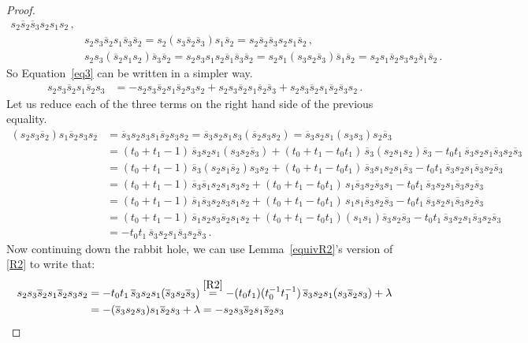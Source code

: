 \documentclass[12pt,reqno]{amsart}
\theoremstyle{definition}
\def\hs{\overline{s}}
\begin{document}
\begin{proof}
\begin{align*}
s_2 \hs_2 \hs_3 s_2 s_1 s_2 \,,
\\
&s_2 s_3 \hs_2 s_1 \hs_3 \hs_2    = s_2 (s_3 \hs_2 \hs_3) s_1 \hs_2
= s_2 \hs_2 \hs_3 s_2 s_1 \hs_2 \,,
\\
&s_2 s_3 (\hs_2 s_1 s_2) \hs_3 \hs_2   = s_2 s_3 s_1 s_2 \hs_1 \hs_3 \hs_2
= s_2 s_1 (s_3 s_2 \hs_3) \hs_1 \hs_2 = s_2 s_1 \hs_2 s_3 s_2 \hs_1 \hs_2 \,.
\end{align*}
So Equation~\eqref{eq3} can be written in a simpler way.
\begin{align*}
  s_2 s_3 \hs_2 s_1 \hs_2 s_3&   =  - s_2 s_3 \hs_2 s_1 \hs_2 s_3 s_2
  + s_2 s_3 \hs_2 s_1 \hs_2 \hs_3 + s_2 s_3 \hs_2 s_1 \hs_2 \hs_3 s_2 \,.
\end{align*}
Let us reduce each of the three terms on the right hand side of the previous equality.
\begin{align*}
  (s_2 s_3 \hs_2) s_1 \hs_2 s_3 s_2   & = \hs_3 s_2 s_3 s_1 \hs_2 s_3 s_2
  = \hs_3 s_2 s_1 s_3 (\hs_2 s_3 s_2) = \hs_3 s_2 s_1 (s_3 s_3) s_2 \hs_3 \\
  & =  (t_0 + t_1 - 1) \, \hs_3 s_2 s_1 (s_3 s_2 \hs_3) + (t_0 + t_1 - t_0 t_1 )\,
  \hs_3 (s_2 s_1 s_2) \hs_3 - t_0 t_1 \, \hs_3 s_2 s_1 \hs_3 s_2 \hs_3 \\
  & =  (t_0 + t_1 - 1) \, \hs_3 (s_2 s_1 \hs_2) s_3 s_2 + (t_0 + t_1 - t_0 t_1 )\,
  \hs_3 s_1 s_2 s_1 \hs_3 - t_0 t_1 \, \hs_3 s_2 s_1 \hs_3 s_2 \hs_3 \\
  & =  (t_0 + t_1 - 1) \, \hs_3 \hs_1 s_2 s_1 s_3 s_2 + (t_0 + t_1 - t_0 t_1 )\,
  s_1 \hs_3 s_2 \hs_3 s_1 - t_0 t_1 \, \hs_3 s_2 s_1 \hs_3 s_2 \hs_3 \\
  & =  (t_0 + t_1 - 1) \, \hs_1 \hs_3 s_2 s_3 s_1 s_2 + (t_0 + t_1 - t_0 t_1 )\,
  s_1 s_1 \hs_3 s_2 \hs_3 - t_0 t_1 \, \hs_3 s_2 s_1 \hs_3 s_2 \hs_3 \\
  & =  (t_0 + t_1 - 1) \, \hs_1 s_2 s_3 \hs_2 s_1 s_2 + (t_0 + t_1 - t_0 t_1 )
  (s_1 s_1) \hs_3 s_2 \hs_3 - t_0 t_1 \, \hs_3 s_2 s_1 \hs_3 s_2 \hs_3 \\
   & = - t_0 t_1 \, \hs_3 s_2 s_1 \hs_3 s_2 \hs_3 \,.
\end{align*}
Now continuing down the rabbit hole, we can use Lemma~\ref{equivR2}'s version of
\eqref{R2} to write that:
\begin{align*}
  s_2 s_3 \hs_2 s_1 \hs_2 s_3 s_2   & =   - t_0 t_1 \, \hs_3 s_2 s_1 (\hs_3
  s_2 \hs_3) \overset{\eqref{R2}}{=} - (t_0 t_1)(t_0^{-1} t_1^{-1}) \, \hs_3
  s_2 s_1 (s_3 \hs_2 s_3) + \lambda \\
  & =  - (\hs_3 s_2 s_3) s_1 \hs_2 s_3 + \lambda = - s_2 s_3 \hs_2 s_1 \hs_2 s_3

\end{align*}
\end{proof}
\end{document}
